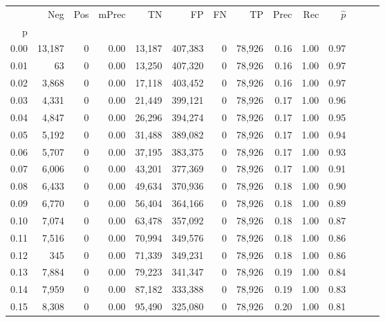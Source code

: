 \begin{tabular}{rrrrrrrrrrrrrr}
\toprule
{} &     Neg &    Pos & mPrec &       TN &       FP &      FN &      TP &  Prec &   Rec & $\hat{p}$ \\
p    &         &        &       &          &          &         &         &       &       &           \\
\midrule
0.00 &  13,187 &      0 &  0.00 &   13,187 &  407,383 &       0 &  78,926 &  0.16 &  1.00 &      0.97 \\
0.01 &      63 &      0 &  0.00 &   13,250 &  407,320 &       0 &  78,926 &  0.16 &  1.00 &      0.97 \\
0.02 &   3,868 &      0 &  0.00 &   17,118 &  403,452 &       0 &  78,926 &  0.16 &  1.00 &      0.97 \\
0.03 &   4,331 &      0 &  0.00 &   21,449 &  399,121 &       0 &  78,926 &  0.17 &  1.00 &      0.96 \\
0.04 &   4,847 &      0 &  0.00 &   26,296 &  394,274 &       0 &  78,926 &  0.17 &  1.00 &      0.95 \\
0.05 &   5,192 &      0 &  0.00 &   31,488 &  389,082 &       0 &  78,926 &  0.17 &  1.00 &      0.94 \\
0.06 &   5,707 &      0 &  0.00 &   37,195 &  383,375 &       0 &  78,926 &  0.17 &  1.00 &      0.93 \\
0.07 &   6,006 &      0 &  0.00 &   43,201 &  377,369 &       0 &  78,926 &  0.17 &  1.00 &      0.91 \\
0.08 &   6,433 &      0 &  0.00 &   49,634 &  370,936 &       0 &  78,926 &  0.18 &  1.00 &      0.90 \\
0.09 &   6,770 &      0 &  0.00 &   56,404 &  364,166 &       0 &  78,926 &  0.18 &  1.00 &      0.89 \\
0.10 &   7,074 &      0 &  0.00 &   63,478 &  357,092 &       0 &  78,926 &  0.18 &  1.00 &      0.87 \\
0.11 &   7,516 &      0 &  0.00 &   70,994 &  349,576 &       0 &  78,926 &  0.18 &  1.00 &      0.86 \\
0.12 &     345 &      0 &  0.00 &   71,339 &  349,231 &       0 &  78,926 &  0.18 &  1.00 &      0.86 \\
0.13 &   7,884 &      0 &  0.00 &   79,223 &  341,347 &       0 &  78,926 &  0.19 &  1.00 &      0.84 \\
0.14 &   7,959 &      0 &  0.00 &   87,182 &  333,388 &       0 &  78,926 &  0.19 &  1.00 &      0.83 \\
0.15 &   8,308 &      0 &  0.00 &   95,490 &  325,080 &       0 &  78,926 &  0.20 &  1.00 &      0.81 \\

\end{tabular}
